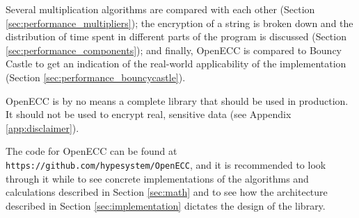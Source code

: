 Several multiplication algorithms are compared with each other (Section \ref{sec:performance_multipliers});
the encryption of a string is broken down and the distribution of time spent in different parts of the program
is discussed (Section \ref{sec:performance_components}); and finally, OpenECC is compared to Bouncy Castle to
get an indication of the real-world applicability of the implementation (Section \ref{sec:performance_bouncycastle}).

OpenECC is by no means a complete library that should be used in production. It should not be used to encrypt real,
sensitive data (see Appendix \ref{app:disclaimer}).

The code for OpenECC can be found at \texttt{https://github.com/hypesystem/OpenECC}, and it is recommended to look
through it while to see concrete implementations of the algorithms and calculations described in Section
\ref{sec:math} and to see how the architecture described in Section \ref{sec:implementation} dictates the design
of the library.